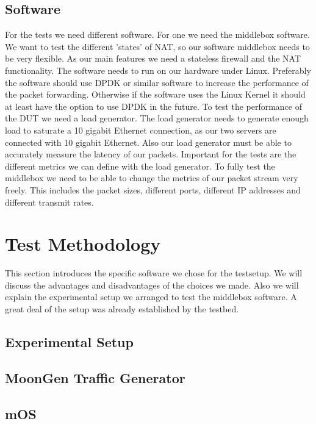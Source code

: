 \documentclass[11pt,a4paper,twoside,openright,bachelor,english]{netthesis}
\begin{document}
\subsection{Software}

For the tests we need different software. For one we need the middlebox software. We want to test the different 'states' of NAT, so our software middlebox needs to be very flexible. As our main features we need a stateless firewall and the NAT functionality. The software needs to run on our hardware under Linux. Preferably the software should use DPDK or similar software to increase the performance of the packet forwarding. Otherwise if the software uses the Linux Kernel it should at least have the option to use DPDK in the future. To test the performance of the DUT we need a load generator. The load generator needs to generate enough load to saturate a 10 gigabit Ethernet connection, as our two servers are connected with 10 gigabit Ethernet. Also our load generator must be able to accurately measure the latency of our packets. Important for the tests are the different metrics we can define with the load generator. To fully test the middlebox we need to be able to change the metrics of our packet stream very freely. This includes the packet sizes, different ports, different IP addresses and different transmit rates.



\section{Test Methodology}

This section introduces the specific software we chose for the testsetup. We will discuss the advantages and disadvantages of the choices we made. Also we will explain the experimental setup we arranged to test the middlebox software. A great deal of the setup was already established by the testbed. 


\subsection{Experimental Setup}

\subsection{MoonGen Traffic Generator}

\subsection{mOS}
\end{document}
